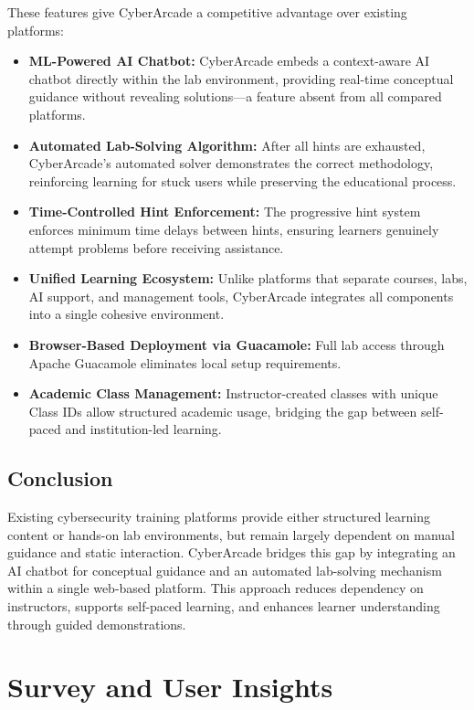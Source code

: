 \documentclass[12pt,a4paper]{report}
\begin{document}
These features give CyberArcade a competitive advantage over existing platforms:
\begin{itemize}
  \item \textbf{ML-Powered AI Chatbot:} CyberArcade embeds a context-aware AI chatbot directly within the lab environment, providing real-time conceptual guidance without revealing solutions---a feature absent from all compared platforms.
  \item \textbf{Automated Lab-Solving Algorithm:} After all hints are exhausted, CyberArcade's automated solver demonstrates the correct methodology, reinforcing learning for stuck users while preserving the educational process.
  \item \textbf{Time-Controlled Hint Enforcement:} The progressive hint system enforces minimum time delays between hints, ensuring learners genuinely attempt problems before receiving assistance.
  \item \textbf{Unified Learning Ecosystem:} Unlike platforms that separate courses, labs, AI support, and management tools, CyberArcade integrates all components into a single cohesive environment.
  \item \textbf{Browser-Based Deployment via Guacamole:} Full lab access through Apache Guacamole eliminates local setup requirements.
  \item \textbf{Academic Class Management:} Instructor-created classes with unique Class IDs allow structured academic usage, bridging the gap between self-paced and institution-led learning.
\end{itemize}

\subsection{Conclusion}

Existing cybersecurity training platforms provide either structured learning content or hands-on lab
environments, but remain largely dependent on manual guidance and static interaction. CyberArcade
bridges this gap by integrating an AI chatbot for conceptual guidance and an automated lab-solving
mechanism within a single web-based platform. This approach reduces dependency on instructors,
supports self-paced learning, and enhances learner understanding through guided demonstrations.

\section{Survey and User Insights}
\end{document}
